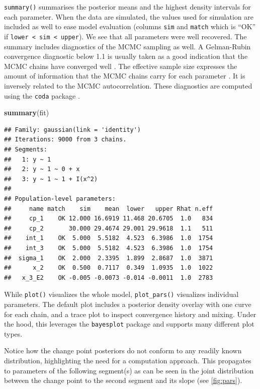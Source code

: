 \documentclass[
  american,
]{article}
\newenvironment{Shaded}{\begin{snugshade}}{\end{snugshade}}
\newcommand{\KeywordTok}[1]{\textcolor[rgb]{0.13,0.29,0.53}{\textbf{#1}}}
\newcommand{\NormalTok}[1]{#1}
\begin{document}
\texttt{summary()} summarises the posterior means and the highest density intervals for each parameter. When the data are simulated, the values used for simulation are included as well to ease model evaluation (columns \texttt{sim} and \texttt{match} which is ``OK'' if \texttt{lower\ \textless{}\ sim\ \textless{}\ upper}). We see that all parameters were well recovered. The summary includes diagnostics of the MCMC sampling as well. A Gelman-Rubin convergence diagnostic below 1.1 is usually taken as a good indication that the MCMC chains have converged well \citep{gelman1992}. The effective sample size expresses the amount of information that the MCMC chains carry for each parameter \citep{martino2017}. It is inversely related to the MCMC autocorrelation. These diagnostics are computed using the \texttt{coda} package \citep{plummer2006}.

\begin{Shaded}
\begin{Highlighting}[]
\KeywordTok{summary}\NormalTok{(fit)}
\end{Highlighting}
\end{Shaded}

\begin{verbatim}
## Family: gaussian(link = 'identity')
## Iterations: 9000 from 3 chains.
## Segments:
##   1: y ~ 1
##   2: y ~ 1 ~ 0 + x
##   3: y ~ 1 ~ 1 + I(x^2)
## 
## Population-level parameters:
##     name match    sim    mean  lower   upper Rhat n.eff
##     cp_1    OK 12.000 16.6919 11.468 20.6705  1.0   834
##     cp_2       30.000 29.4674 29.001 29.9618  1.1   511
##    int_1    OK  5.000  5.5182  4.523  6.3986  1.0  1754
##    int_3    OK  5.000  5.5182  4.523  6.3986  1.0  1754
##  sigma_1    OK  2.000  2.3395  1.899  2.8687  1.0  3871
##      x_2    OK  0.500  0.7117  0.349  1.0935  1.0  1022
##   x_3_E2    OK -0.005 -0.0073 -0.014 -0.0011  1.0  2783
\end{verbatim}

While \texttt{plot()} visualizes the whole model, \texttt{plot\_pars()} visualizes individual parameters. The default plot includes a posterior density overlay with one curve for each chain, and a trace plot to inspect convergence history and mixing. Under the hood, this leverages the \texttt{bayesplot} package \citep{gabry2019} and supports many different plot types.

Notice how the change point posteriors do not conform to any readily known distribution, highlighting the need for a computation approach. This propagates to parameters of the following segment(s) as can be seen in the joint distribution between the change point to the second segment and its slope (see \ref{fig:pars}).
\end{document}
